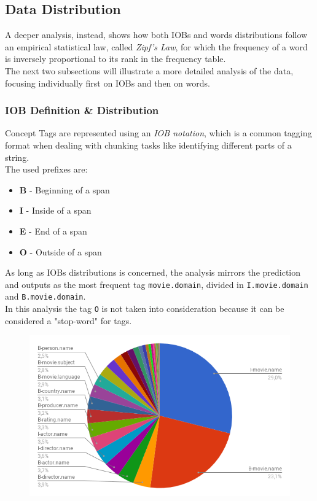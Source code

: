 \documentclass[11pt,a4paper]{article}
\begin{document}
\subsection{Data Distribution}

A deeper analysis, instead, shows how both IOBs and words distributions follow an empirical statistical law, called \textit{Zipf's Law}, for which the frequency of a word is inversely proportional to its rank in the frequency table.\\

The next two subsections will illustrate a more detailed analysis of the data, focusing individually first on IOBs and then on words.

\subsubsection{IOB Definition \& Distribution}
 
 Concept Tags are represented using an \textit{IOB notation}, which is a common tagging format when dealing with chunking tasks like identifying different parts of a string. \\
 The used prefixes are:
 \begin{itemize}
 	\item \textbf{B} - Beginning of a span
 	\item \textbf{I} - Inside of a span
 	\item \textbf{E} - End of a span
 	\item \textbf{O} - Outside of a span
 \end{itemize}
 
As long as IOBs distributions is concerned, the analysis mirrors the prediction and outputs as the most frequent tag {\tt movie.domain}, divided in {\tt I.movie.domain} and {\tt B.movie.domain}.\\

In this analysis the tag {\tt O} is not taken into consideration because it can be considered a "stop-word" for tags.
 
\begin{figure}[H]
	\includegraphics[scale=.35]{img/IOB_chart_noO.png}
	\label{fig:f1res}
\end{figure}
\end{document}
